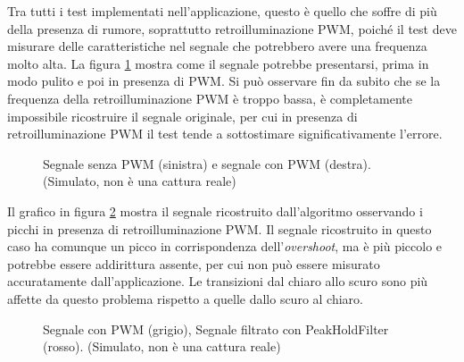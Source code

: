 Tra tutti i test implementati nell'applicazione, questo è quello che soffre di più della presenza di rumore, soprattutto retroilluminazione PWM, poiché il test deve misurare delle caratteristiche nel segnale che potrebbero avere una frequenza molto alta. La figura \ref{fig:pixelOverdriveTest_example1} mostra come il segnale potrebbe presentarsi, prima in modo pulito e poi in presenza di PWM. Si può osservare fin da subito che se la frequenza della retroilluminazione PWM è troppo bassa, è completamente impossibile ricostruire il segnale originale, per cui in presenza di retroilluminazione PWM il test tende a sottostimare significativamente l'errore.

\begin{figure}[H]
	\centering
	\caption{Segnale senza PWM (sinistra) e segnale con PWM (destra). (Simulato, non è una cattura reale)}
	\label{fig:pixelOverdriveTest_example1}
\end{figure}

Il grafico in figura \ref{fig:pixelOverdriveTest_example2} mostra il segnale ricostruito dall'algoritmo osservando i picchi in presenza di retroilluminazione PWM. Il segnale ricostruito in questo caso ha comunque un picco in corrispondenza dell'\textit{overshoot}, ma è più piccolo e potrebbe essere addirittura assente, per cui non può essere misurato accuratamente dall'applicazione. Le transizioni dal chiaro allo scuro sono più affette da questo problema rispetto a quelle dallo scuro al chiaro.

\begin{figure}[H]
	\centering
	\caption{Segnale con PWM (grigio), Segnale filtrato con PeakHoldFilter (rosso). (Simulato, non è una cattura reale)}
	\label{fig:pixelOverdriveTest_example2}
\end{figure}


